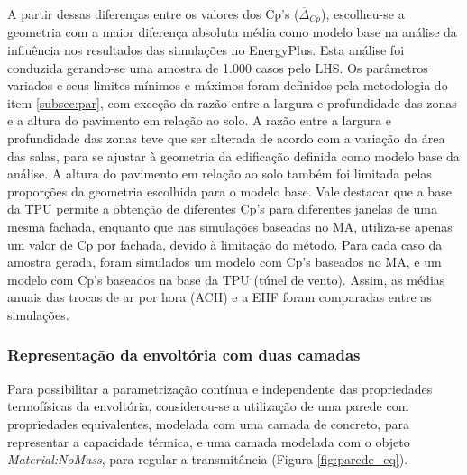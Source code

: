 \documentclass[brazil,hardcopy,openany,a5paper]{ufscthesis}
\begin{document}
		A partir dessas diferenças entre os valores dos Cp's ($\overline{\Delta}_{Cp}$), escolheu-se a geometria com a maior diferença absoluta média como modelo base na análise da influência nos resultados das simulações no EnergyPlus.
		Esta análise foi conduzida gerando-se uma amostra de 1.000 casos pelo LHS.
		Os parâmetros variados e seus limites mínimos e máximos foram definidos pela metodologia do item \ref{subsec:par}, com exceção da razão entre a largura e profundidade das zonas e a altura do pavimento em relação ao solo.
		A razão entre a largura e profundidade das zonas teve que ser alterada de acordo com a variação da área das salas, para se ajustar à geometria da edificação definida como modelo base da análise.
		A altura do pavimento em relação ao solo também foi limitada pelas proporções da geometria escolhida para o modelo base.
		Vale destacar que a base da TPU permite a obtenção de diferentes Cp's para diferentes janelas de uma mesma fachada, enquanto que nas simulações baseadas no MA, utiliza-se apenas um valor de Cp por fachada, devido à limitação do método. 
		Para cada caso da amostra gerada, foram simulados um modelo com Cp’s baseados no MA, e um modelo com Cp’s baseados na base da TPU (túnel de vento).
		Assim, as médias anuais das trocas de ar por hora (ACH) e a EHF foram comparadas entre as simulações.
				
%		
		
		\subsubsection{Representação da envoltória com duas camadas}
		
		Para possibilitar a parametrização contínua e independente das propriedades termofísicas da envoltória, considerou-se a utilização de uma parede com propriedades equivalentes, modelada com uma camada de concreto, para representar a capacidade térmica, e uma camada modelada com o objeto \textit{Material:NoMass}, para regular a transmitância (Figura \ref{fig:parede_eq}).
		
\end{document}
